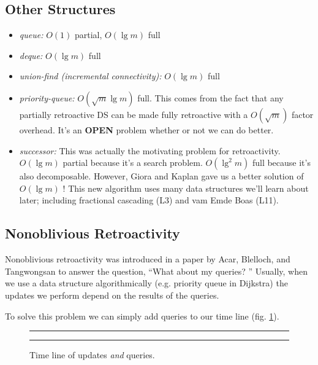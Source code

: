 \documentclass[11pt]{article}
\begin{document}
\subsection{Other Structures}
\begin{itemize}
\item{\emph{queue:}} $O(1)$ partial, $O(\lg m)$ full
\item{\emph{deque:}} $O(\lg m)$ full
\item{\emph{union-find (incremental connectivity):}} $O(\lg m)$ full
\item{\emph{priority-queue:}} $O(\sqrt{m}\lg m)$ full. This comes from the fact that any partially retroactive DS can be made fully retroactive with a $O(\sqrt{m})$ factor overhead.  It's an {\bf OPEN} problem whether or not we can do better.
\item{\emph{successor:}} This was actually the motivating problem for retroactivity.  $O(\lg m)$ partial because it's a search problem. $O(\lg^2 m)$ full because it's also decomposable.  However, Giora and Kaplan gave us a better solution of $O(\lg m)$ \cite{gk}!  This new algorithm uses many data structures we'll learn about later; including fractional cascading (L3) and vam Emde Boas (L11).

\end{itemize}

\subsection{Nonoblivious Retroactivity}

Nonoblivious retroactivity was introduced in a paper by Acar, Blelloch, and Tangwongsan to answer the question, ``What about my queries? \cite{abt}''  Usually, when we use a data structure algorithmically (e.g. priority queue in Dijkstra) the updates we perform depend on the results of the queries.

To solve this problem we can simply add queries to our time line (fig. \ref{fig-nrtl}).

\begin{figure}[ht]
	\rule{\textwidth}{0.005in}
  \begin{center}
  \end{center}

  \caption{\small Time line of updates \emph{and} queries.}
  \label{fig-nrtl}
	\rule{\textwidth}{0.005in}
\end{figure}
\end{document}
